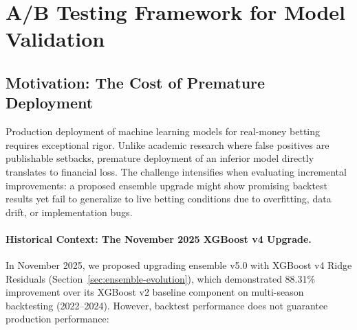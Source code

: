 %
%
%

\section{A/B Testing Framework for Model Validation}
\label{sec:ab-testing-framework}

\subsection{Motivation: The Cost of Premature Deployment}

Production deployment of machine learning models for real-money betting requires exceptional rigor. Unlike academic research where false positives are publishable setbacks, premature deployment of an inferior model directly translates to financial loss. The challenge intensifies when evaluating incremental improvements: a proposed ensemble upgrade might show promising backtest results yet fail to generalize to live betting conditions due to overfitting, data drift, or implementation bugs.

\paragraph{Historical Context: The November 2025 XGBoost v4 Upgrade.}
In November 2025, we proposed upgrading ensemble v5.0 with XGBoost v4 Ridge Residuals (Section~\ref{sec:ensemble-evolution}), which demonstrated 88.31\% improvement over its XGBoost v2 baseline component on multi-season backtesting (2022--2024). However, backtest performance does not guarantee production performance:

